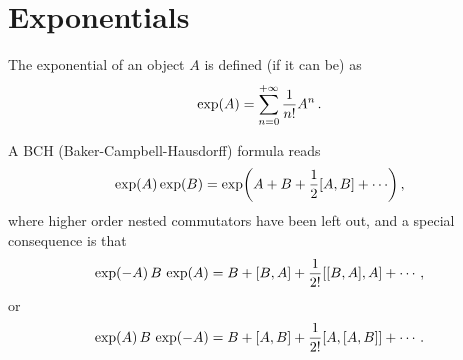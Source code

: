 \section{Exponentials}
The exponential of an object $A$ is defined (if it can be) as
\begin{equation}
    \exp(A) = \sum_{n=0}^{+\infty} \frac{1}{n!} A^n \thinspace .
\end{equation}

A BCH (Baker-Campbell-Hausdorff) formula reads
\begin{equation}
    \exp(A) \exp(B) = \exp(A + B + \frac{1}{2} \comm{A}{B} + \cdots) \thinspace ,
\end{equation}
where higher order nested commutators have been left out, and a special consequence is that
\begin{equation}
    \exp(-A) \thinspace B \thinspace \exp(A) = B + \comm{B}{A} + \frac{1}{2!} \comm{\comm{B}{A}}{A} + \cdots \thinspace ,
\end{equation}
or
\begin{equation}
    \exp(A) \thinspace B \thinspace \exp(-A) = B + \comm{A}{B} + \frac{1}{2!} \comm{A}{\comm{A}{B}} + \cdots \thinspace .
\end{equation}
